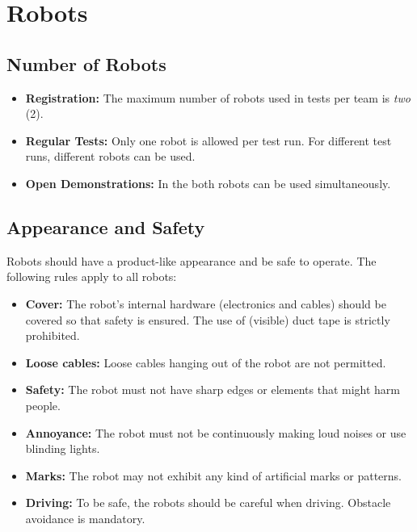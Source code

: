 \section{Robots}
\label{sec:rules:robots}

\subsection{Number of Robots}
\label{sec:rules:robotsnumber}

\begin{itemize}
	\item \textbf{Registration:} The maximum number of robots used in tests per team is \emph{two} (2).
	\item \textbf{Regular Tests:} Only one robot is allowed per test run. For different test runs, different robots can be used.
	\item \textbf{Open Demonstrations:} In the  both robots can be used simultaneously.
\end{itemize}

\subsection{Appearance and Safety}
\label{sec:rules:robotappearance}

Robots should have a product-like appearance and be safe to operate. The following rules apply to all robots:
\begin{itemize}
	\item \textbf{Cover:} The robot's internal hardware (electronics and cables) should be covered so that safety is ensured. The use of (visible) duct tape is strictly prohibited.
	\item \textbf{Loose cables:} Loose cables hanging out of the robot are not permitted.
	\item \textbf{Safety:} The robot must not have sharp edges or elements that might harm people.
	\item \textbf{Annoyance:} The robot must not be continuously making loud noises or use blinding lights.
	\item \textbf{Marks:} The robot may not exhibit any kind of artificial marks or patterns.
	\item \textbf{Driving:} To be safe, the robots should be careful when driving. Obstacle avoidance is mandatory.
\end{itemize}







